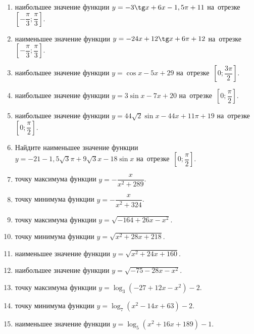 \documentclass[a4paper,10pt]{article}
\begin{document}
\begin{enumerate}
\item {} наибольшее значение функции $y=-3\tg x +6x-1,5\pi +11$ на~отрезке~$\left[-\dfrac{\pi}{3};\dfrac{\pi}{3}\right]$.

\item {} наименьшее значение функции $y=-24x +12\tg x+6\pi+12$ на~отрезке~$\left[-\dfrac{\pi}{3};\dfrac{\pi}{3}\right]$.

\item {} наибольшее значение функции $y=\cos x-5x+29$ на~отрезке~$\left[0;\dfrac{3\pi}{2}\right]$.

\item {} наибольшее значение функции $y=3\sin x-7x+20$ на~отрезке~$\left[0;\dfrac{\pi}{2}\right]$.

\item {} наибольшее значение функции $y=44\sqrt{2}\sin x-44x+11\pi +19$ на~отрезке~$\left[0;\dfrac{\pi}{2}\right]$.

\item Найдите наименьшее значение функции $y=-21-1,5\sqrt{3}\pi+9\sqrt{3}x-18\sin x$ на~отрезке~$\left[0;\dfrac{\pi}{2}\right]$.

\item {} точку максимума функции $y=-\dfrac{x}{ x^2 +289}$.

\item {} точку минимума функции $y=-\dfrac{x}{ x^2 +324}$.

\item {} точку максимума функции $y=\sqrt{-164+26x-x^2}$.

\item {} точку минимума функции $y=\sqrt{x^2+28x+218}$.

\item {} наименьшее значение функции $y=\sqrt{x^2+24x+160}$.

\item {} наибольшее значение функции $y=\sqrt{-75-28x-x^2}$.

\item {} точку максимума функции $y=\log_3\left(-27+12x-x^2\right)-2$.

\item {} точку минимума функции $y=\log_7\left(x^2-14x+63\right)-2$.

\item {} наименьшее значение функции $y=\log_5\left(x^2+16x+189\right)-1$.


\end{enumerate}
\end{document}
